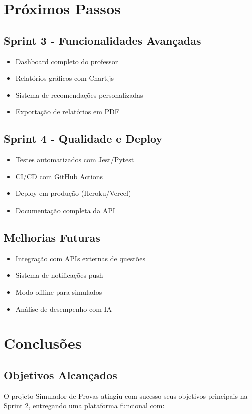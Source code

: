 \documentclass[12pt,a4paper]{article}
\begin{document}
\section{Próximos Passos}

\subsection{Sprint 3 - Funcionalidades Avançadas}
\begin{itemize}
    \item Dashboard completo do professor
    \item Relatórios gráficos com Chart.js
    \item Sistema de recomendações personalizadas
    \item Exportação de relatórios em PDF
\end{itemize}

\subsection{Sprint 4 - Qualidade e Deploy}
\begin{itemize}
    \item Testes automatizados com Jest/Pytest
    \item CI/CD com GitHub Actions
    \item Deploy em produção (Heroku/Vercel)
    \item Documentação completa da API
\end{itemize}

\subsection{Melhorias Futuras}
\begin{itemize}
    \item Integração com APIs externas de questões
    \item Sistema de notificações push
    \item Modo offline para simulados
    \item Análise de desempenho com IA
\end{itemize}

\section{Conclusões}

\subsection{Objetivos Alcançados}
O projeto Simulador de Provas atingiu com sucesso seus objetivos principais na Sprint 2, entregando uma plataforma funcional com:
\end{document}
